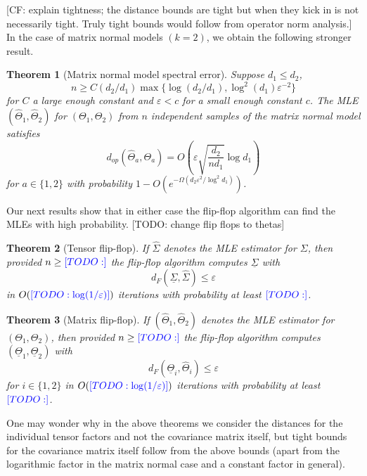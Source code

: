 \documentclass{article}
\newtheorem{theorem}{Theorem}
\newcommand\eps{\varepsilon}
\newcommand{\CF}[1]{{\color{purple}[CF: #1]}}
\newcommand{\TODO}[1]{{\color{blue}[TODO: #1]}}
\begin{document}
\CF{explain tightness; the distance bounds are tight but when they kick in is not necessarily tight. Truly tight bounds would follow from operator norm analysis.} In the case of matrix normal models $(k=2)$, we obtain the following stronger result.

\begin{theorem}[Matrix normal model spectral error]\label{thm:matrix-normal} Suppose $d_1 \leq d_2$,
$$n \geq C (d_2/d_1) \max\{\log (d_2/d_1),  \log^2(d_1) \eps^{-2}\}$$ for $C$ a large enough constant and $\eps < c$ for a small enough constant $c$. The MLE $(\widehat{\Theta}_1,\widehat{\Theta}_2) $ for $(\Theta_1, \Theta_2)$ from $n$ independent samples of the matrix normal model satisfies
$$ d_{op}(\widehat{\Theta}_a, \Theta_a) = O\left(\eps \sqrt{\frac{d_2}{n d_1}} \log d_1\right) $$
for $a \in \{1,2\}$ with probability $1 - O(e^{ - \Omega( d_2 \eps^2/\log^2 d_1)})$.
\end{theorem}

Our next results show that in either case the flip-flop algorithm can find the MLEs with high probability. \TODO{change flip flops to thetas}

\begin{theorem}[Tensor flip-flop]\label{thm:tensor-flipflop} If $\hat{\Sigma}$ denotes the MLE estimator for $\Sigma$, then provided $n \geq \TODO{}$ the flip-flop algorithm computes $\underline{\Sigma}$ with
$$ d_F(\underline{\Sigma}, \hat{\Sigma}) \leq \eps $$
in $O(\TODO{\log(1/\eps)})$ iterations with probability at least $\TODO{}$.
\end{theorem}

\begin{theorem}[Matrix flip-flop]\label{thm:matrix-flipflop} If $(\hat{\Theta}_1, \hat{\Theta}_2) $ denotes the MLE estimator for $(\Theta_1, \Theta_2)$, then provided $n \geq \TODO{}$ the flip-flop algorithm computes $(\underline{\Theta}_1, \underline{\Theta}_2)$ with
$$ d_F(\underline{\Theta}_i, \hat{\Theta}_i) \leq \eps $$
for $i \in \{1,2\}$ in $O(\TODO{\log(1/\eps)})$ iterations with probability at least $\TODO{}$.
\end{theorem}

One may wonder why in the above theorems we consider the distances for the individual tensor factors and not the covariance matrix itself, but tight bounds for the covariance matrix itself follow from the above bounds (apart from the logarithmic factor in the matrix normal case and a constant factor in general).

\end{document}
